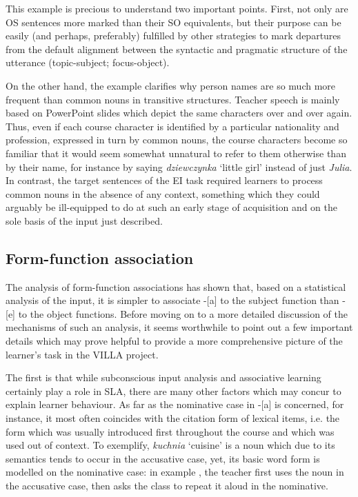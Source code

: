 This example is precious to understand two important points. First, not only are OS sentences more marked than their SO equivalents, but their purpose can be easily (and perhaps, preferably) fulfilled by other strategies to mark departures from the default alignment between the syntactic and pragmatic structure of the utterance (topic-subject; focus-object).

On the other hand, the example clarifies why person names are so much more frequent than common nouns in transitive structures. Teacher speech is mainly based on PowerPoint slides which depict the same characters over and over again. Thus, even if each course character is identified by a particular nationality and profession, expressed in turn by common nouns, the course characters become so familiar that it would seem somewhat unnatural to refer to them otherwise than by their name, for instance by saying \textit{dziewczynka} ‘little girl’ instead of just \textit{Julia}. In contrast, the target sentences of the EI task required learners to process common nouns in the absence of any context, something which they could arguably be ill-equipped to do at such an early stage of acquisition and on the sole basis of the input just described.

\subsection{Form-function association}\label{sec:08:1.2}

The analysis of form-function associations has shown that, based on a statistical analysis of the input, it is simpler to associate -[a] to the subject function than -[e] to the object functions. Before moving on to a more detailed discussion of the mechanisms of such an analysis, it seems worthwhile to point out a few important details which may prove helpful to provide a more comprehensive picture of the learner’s task in the VILLA project.

The first is that while subconscious input analysis and associative learning certainly play a role in SLA, there are many other factors which may concur to explain learner behaviour. As far as the nominative case in -[a] is concerned, for instance, it most often coincides with the citation form of lexical items, i.e. the form which was usually introduced first throughout the course and which was used out of context. To exemplify, \textit{kuchnia} ‘cuisine’ is a noun which due to its semantics tends to occur in the accusative case, yet, its basic word form is modelled on the nominative case: in example , the teacher first uses the noun in the accusative case, then asks the class to repeat it aloud in the nominative.

